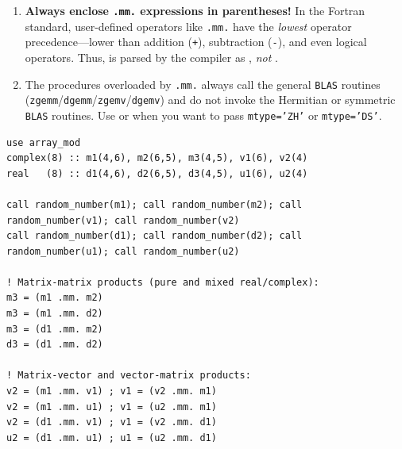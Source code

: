 \begin{warnbox}
\begin{enumerate}
  \item \textbf{Always enclose \texttt{.mm.} expressions in parentheses!} In the Fortran standard, user-defined operators like \texttt{.mm.} have the \emph{lowest} operator precedence---lower than addition (\texttt{+}), subtraction (\texttt{-}), and even logical operators. Thus,  is parsed by the compiler as , \emph{not} .
  \item The procedures overloaded by \texttt{.mm.} always call the general \texttt{BLAS} routines (\texttt{zgemm}/\texttt{dgemm}/\texttt{zgemv}/\texttt{dgemv}) and do not invoke the Hermitian or symmetric \texttt{BLAS} routines. Use  or  when you want to pass \texttt{mtype='ZH'} or \texttt{mtype='DS'}.
\end{enumerate}
\end{warnbox}

\begin{description}[leftmargin=2.2cm, style=nextline]
\end{description}

\lstset{language=[95]Fortran}
\begin{lstlisting}
use array_mod
complex(8) :: m1(4,6), m2(6,5), m3(4,5), v1(6), v2(4)
real   (8) :: d1(4,6), d2(6,5), d3(4,5), u1(6), u2(4)

call random_number(m1); call random_number(m2); call random_number(v1); call random_number(v2)
call random_number(d1); call random_number(d2); call random_number(u1); call random_number(u2)

! Matrix-matrix products (pure and mixed real/complex):
m3 = (m1 .mm. m2)
m3 = (m1 .mm. d2)
m3 = (d1 .mm. m2)
d3 = (d1 .mm. d2)

! Matrix-vector and vector-matrix products:
v2 = (m1 .mm. v1) ; v1 = (v2 .mm. m1)
v2 = (m1 .mm. u1) ; v1 = (u2 .mm. m1)
v2 = (d1 .mm. v1) ; v1 = (v2 .mm. d1)
u2 = (d1 .mm. u1) ; u1 = (u2 .mm. d1)
\end{lstlisting}

